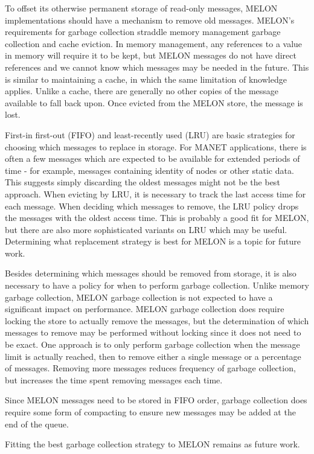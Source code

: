 To offset its otherwise permanent storage of read-only messages, MELON implementations should have a mechanism to remove old messages. MELON's requirements for garbage collection straddle memory management garbage collection and cache eviction. In memory management, any references to a value in memory will require it to be kept, but MELON messages do not have direct references and we cannot know which messages may be needed in the future. This is similar to maintaining a cache, in which the same limitation of knowledge applies. Unlike a cache, there are generally no other copies of the message available to fall back upon. Once evicted from the MELON store, the message is lost.

First-in first-out (FIFO) and least-recently used (LRU) are basic strategies for choosing which messages to replace in storage. For MANET applications, there is often a few messages which are expected to be available for extended periods of time - for example, messages containing identity of nodes or other static data. This suggests simply discarding the oldest messages might not be the best approach. When evicting by LRU, it is necessary to track the last access time for each message. When deciding which messages to remove, the LRU policy drops the messages with the oldest access time. This is probably a good fit for MELON, but there are also more sophisticated variants on LRU which may be useful. Determining what replacement strategy is best for MELON is a topic for future work.

Besides determining which messages should be removed from storage, it is also necessary to have a policy for when to perform garbage collection. Unlike memory garbage collection, MELON garbage collection is not expected to have a significant impact on performance. MELON garbage collection does require locking the store to actually remove the messages, but the determination of which messages to remove may be performed without locking since it does not need to be exact. One approach is to only perform garbage collection when the message limit is actually reached, then to remove either a single message or a percentage of messages. Removing more messages reduces frequency of garbage collection, but increases the time spent removing messages each time.

Since MELON messages need to be stored in FIFO order, garbage collection does require some form of compacting to ensure new messages may be added at the end of the queue.

Fitting the best garbage collection strategy to MELON remains as future work.
